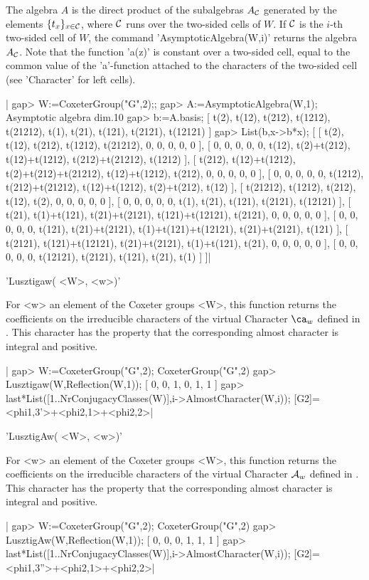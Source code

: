 The  algebra $A$ is the direct product of the subalgebras $A_{\mathcal C}$ generated
by  the elements $\{t_x\}_{x\in{\mathcal C}}$,  where ${\mathcal C}$ runs  over the two-sided
cells  of $W$. If  ${\mathcal C}$ is the  $i$-th two-sided cell  of $W$, the command
'AsymptoticAlgebra(W,i)'   returns  the  algebra  $A_{\mathcal C}$.  Note  that  the
function  'a(z)' is  constant over  a two-sided  cell, equal  to the common
value  of the 'a'-function attached to the characters of the two-sided cell
(see 'Character' for left cells).

|    gap> W:=CoxeterGroup("G",2);;
    gap> A:=AsymptoticAlgebra(W,1);
    Asymptotic algebra dim.10
    gap> b:=A.basis;
    [ t(2), t(12), t(212), t(1212), t(21212), t(1), t(21), t(121),
      t(2121), t(12121) ]
    gap> List(b,x->b*x);
    [ [ t(2), t(12), t(212), t(1212), t(21212), 0, 0, 0, 0, 0 ], 
      [ 0, 0, 0, 0, 0, t(12), t(2)+t(212), t(12)+t(1212), t(212)+t(21212),
          t(1212) ], 
      [ t(212), t(12)+t(1212), t(2)+t(212)+t(21212), t(12)+t(1212), 
          t(212), 0, 0, 0, 0, 0 ], 
      [ 0, 0, 0, 0, 0, t(1212), t(212)+t(21212), t(12)+t(1212), 
          t(2)+t(212), t(12) ], 
      [ t(21212), t(1212), t(212), t(12), t(2), 0, 0, 0, 0, 0 ], 
      [ 0, 0, 0, 0, 0, t(1), t(21), t(121), t(2121), t(12121) ], 
      [ t(21), t(1)+t(121), t(21)+t(2121), t(121)+t(12121), t(2121), 0, 
          0, 0, 0, 0 ], 
      [ 0, 0, 0, 0, 0, t(121), t(21)+t(2121), t(1)+t(121)+t(12121), 
          t(21)+t(2121), t(121) ], 
      [ t(2121), t(121)+t(12121), t(21)+t(2121), t(1)+t(121), t(21), 0, 
          0, 0, 0, 0 ], 
      [ 0, 0, 0, 0, 0, t(12121), t(2121), t(121), t(21), t(1) ] ]|


'Lusztigaw( <W>, <w>)'

For  <w> an element  of the Coxeter  groups <W>, this  function returns the
coefficients on the irreducible characters of the virtual Character $\ca_w$
defined  in \cite[5.10.2]{Lus85}. This character  has the property that the
corresponding almost character is integral and positive.

|    gap> W:=CoxeterGroup("G",2);
    CoxeterGroup("G",2)
    gap> Lusztigaw(W,Reflection(W,1));
    [ 0, 0, 1, 0, 1, 1 ]
    gap> last*List([1..NrConjugacyClasses(W)],i->AlmostCharacter(W,i));
    [G2]=<phi{1,3}'>+<phi{2,1}>+<phi{2,2}>|


'LusztigAw( <W>, <w>)'

For  <w> an element  of the Coxeter  groups <W>, this  function returns the
coefficients on the irreducible characters of the virtual Character ${\mathcal A}_w$
defined  in \cite[5.10.2]{Lus85}. This character  has the property that the
corresponding almost character is integral and positive.

|    gap> W:=CoxeterGroup("G",2);
    CoxeterGroup("G",2)
    gap> LusztigAw(W,Reflection(W,1));
    [ 0, 0, 0, 1, 1, 1 ]
    gap> last*List([1..NrConjugacyClasses(W)],i->AlmostCharacter(W,i));
    [G2]=<phi{1,3}''>+<phi{2,1}>+<phi{2,2}>|
